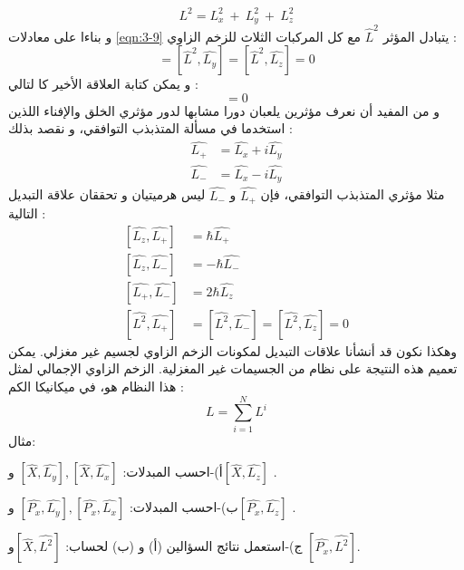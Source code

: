 \begin{equation}
	L^{2} = L_{x}^{2}~+ ~L_{y}^{2} ~+~ L_{z}^{2}
\end{equation}
و بناءا على معادلات \eqref{eqn:3-9} يتبادل المؤثر
$\hat{L}^{2}$ 
مع كل المركبات الثلاث للزخم الزاوي : 
\begin{equation}
	[\hat{L}^{2}, \hat{L_{x}}] = [\hat{L}^{2}, \hat{L_{y}} ]= [\hat{L}^{2}, \hat{L_{z}}]  =0
\end{equation}
و يمكن كتابة العلاقة اﻷخير كا لتالي :
\begin{equation}
	[\hat{L}^{2}, \hat{L}]  =0
\end{equation}
و من المفيد أن نعرف مؤثرين يلعبان دورا مشابها لدور مؤثري‫ الخلق‬ ‫والإفناء‬ اللذين استخدما في مسألة المتذبذب التوافقي، و نقصد بذلك :
\begin{equation}
	\label{eqn:3-10}
	\begin{aligned}
	\hat{L_{+}} & = \hat{L_{x}} + i \hat{L_{y}} \\
	\hat{L_{-}} & = \hat{L_{x}} - i \hat{L_{y}}
	\end{aligned}
\end{equation}
مثلا مؤثري المتذبذب التوافقي، فإن $ \hat{L_{+}} $ و $\hat{L_{-}}$ ليس هرميتيان و تحققان علاقة التبديل التالية :
\begin{equation}
	\label{eqn:3-11}
	\begin{aligned}
		[\hat{L_{z}}, \hat{L_{+}} ]& = \hbar \hat{L_{+}} \\
		[\hat{L_{z}}, \hat{L_{-}} ]& = -\hbar \hat{L_{-}} \\
		[\hat{L_{+}}, \hat{L_{-}} ]& = 2\hbar \hat{L_{z}} \\
		[\hat{L^{2}}, \hat{L_{+}}] & = [\hat{L^{2}}, \hat{L_{-}}] = [\hat{L^{2}}, \hat{L_{z}}] =0
	\end{aligned}
\end{equation}
وهكذا نكون قد أنشأنا علاقات التبديل لمكونات الزخم الزاوي لجسيم غير مغزلي. يمكن تعميم هذه النتيجة على نظام من الجسيمات غير المغزلية. الزخم الزاوي الإجمالي لمثل هذا النظام هو، في ميكانيكا الكم :
\begin{equation}
L=	\sum_{i = 1}^N L^i
\end{equation}
مثال:

أ)-احسب المبدلات:	$ [\hat{X} ,\hat{L_{y}} ],[\hat{X}, \hat{L_{x}} ]$ و$[\hat{X}, \hat{L_{z}} ]$ .

ب)-احسب المبدلات:  $ [\hat{P_{x}}  ,\hat{L_{y}} ] 
,[\hat{P_{x}} , \hat{L_{x}} ] $ 
و$[\hat{P_{x}} , \hat{L_{z}} ]$ .

ج)-استعمل نتائج السؤالين (أ) و (ب) لحساب:
 $[\hat{X},\hat{L^{2}}]$و
 $[\hat{P_{x}},\hat{L^{2}}]$.


